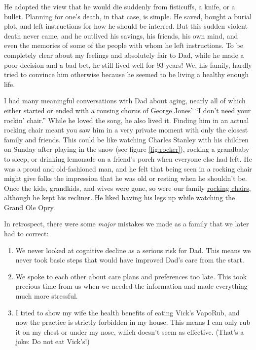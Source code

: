 \documentclass{article}
\begin{document}
He adopted the view that he would die suddenly from fisticuffs, a knife, or a bullet. Planning for one's death, in that case, is simple. He saved, bought a burial plot, and left instructions for how he should be interred. But this sudden violent death never came, and he outlived his savings, his friends, his own mind, and even the memories of some of the people with whom he left instructions. To be completely clear about my feelings and absolutely fair to Dad, while he made a poor decision and a bad bet, he still lived well for 93 years! We, his family, hardly tried to convince him otherwise because he seemed to be living a healthy enough life. 

I had many meaningful conversations with Dad about aging, nearly all of which either started or ended with a rousing chorus of George Jones' ``I don't need your rockin' chair.'' While he loved the song, he also lived it. Finding him in an actual rocking chair meant you saw him in a very private moment with only the closest family and friends. This could be like watching Charles Stanley with his children on Sunday after playing in the snow (see figure \ref{fig:rocker}), rocking a grandbaby to sleep, or drinking lemonade on a friend's porch when everyone else had left. He was a proud and old-fashioned man, and he felt that being seen in a rocking chair might give folks the impression that he was old or resting when he shouldn't be. Once the kids, grandkids, and wives were gone, so were our family \href{https://jayjaybillings.com/2016/08/18/family-rocking-chairs}{rocking chairs}, although he kept his recliner. He liked having his legs up while watching the Grand Ole Opry.

In retrospect, there were some \textit{major} mistakes we made as a family that we later had to correct: 
\begin{enumerate}
    \item We never looked at cognitive decline as a serious risk for Dad. This means we never took basic steps that would have improved Dad's care from the start.
    \item We spoke to each other about care plans and preferences too late. This took precious time from us when we needed the information and made everything much more stressful.
    \item I tried to show my wife the health benefits of eating Vick's VapoRub, and now the practice is strictly forbidden in my house. This means I can only rub it on my chest or under my nose, which doesn't seem as effective. (That's a joke: Do not eat Vick's!)
\end{enumerate}
\end{document}
